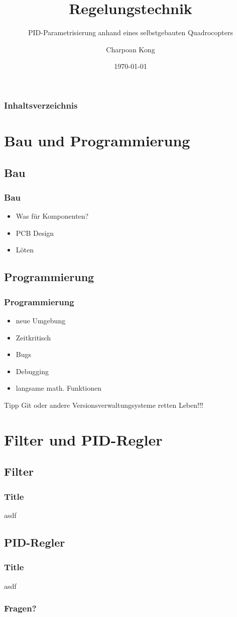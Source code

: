 \documentclass[12pt,a4paper, ngerman]{beamer}
\title{Regelungstechnik}
\subtitle{PID-Parametrisierung anhand eines selbstgebauten Quadrocopters}
\author{Charpoan Kong}
\institute{Kantonsschule Zürich Nord}
\date{\today}
\begin{document}
\begin{frame}
\titlepage
\end{frame}

\begin{frame}
\frametitle{Inhaltsverzeichnis}
\tableofcontents
\end{frame}

\section{Bau und Programmierung}
\subsection{Bau}
 
\begin{frame}
\frametitle{Bau}
\begin{itemize}
\item Was für Komponenten?
\item PCB Design
\item Löten
\end{itemize}
\end{frame}

\subsection{Programmierung}
 
\begin{frame}
\frametitle{Programmierung}
\begin{itemize}
\item neue Umgebung
\item Zeitkritisch
\item Bugs
\item Debugging
\item langsame math. Funktionen
\end{itemize}


\end{frame}

\begin{frame}
\begin{alertblock}{Tipp}
Git oder andere Versionsverwaltungsysteme retten Leben!!!
\end{alertblock}
\end{frame}

\section{Filter und PID-Regler}
\subsection{Filter}

\begin{frame}
\frametitle{Title}
asdf
\end{frame}

\subsection{PID-Regler}

\begin{frame}
\frametitle{Title}
asdf
\end{frame}

\begin{frame}
\frametitle{Fragen?}
\end{frame}
\end{document}

